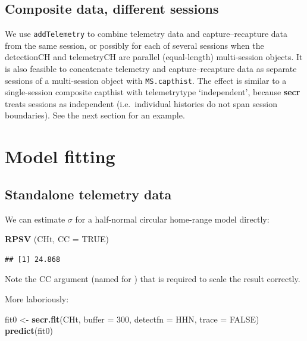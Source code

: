 \documentclass[
]{book}
\newenvironment{Shaded}{\begin{snugshade}}{\end{snugshade}}
\newcommand{\AttributeTok}[1]{\textcolor[rgb]{0.13,0.29,0.53}{#1}}
\newcommand{\ConstantTok}[1]{\textcolor[rgb]{0.56,0.35,0.01}{#1}}
\newcommand{\DecValTok}[1]{\textcolor[rgb]{0.00,0.00,0.81}{#1}}
\newcommand{\FunctionTok}[1]{\textcolor[rgb]{0.13,0.29,0.53}{\textbf{#1}}}
\newcommand{\NormalTok}[1]{#1}
\newcommand{\OtherTok}[1]{\textcolor[rgb]{0.56,0.35,0.01}{#1}}
\newcommand{\StringTok}[1]{\textcolor[rgb]{0.31,0.60,0.02}{#1}}
\begin{document}
\subsection{Composite data, different sessions}\label{composite-data-different-sessions}

We use \texttt{addTelemetry} to combine telemetry data and capture--recapture data from the same session, or possibly for each of several sessions when the detectionCH and telemetryCH are parallel (equal-length) multi-session objects. It is also feasible to concatenate telemetry and capture--recapture data as separate sessions of a multi-session object with \texttt{MS.capthist}. The effect is similar to a single-session composite capthist with telemetrytype `independent', because \textbf{secr} treats sessions as independent (i.e.~individual histories do not span session boundaries). See the next section for an example.

\section{Model fitting}\label{model-fitting-2}

\subsection{Standalone telemetry data}\label{standalone-telemetry-data-1}

We can estimate \(\sigma\) for a half-normal circular home-range model directly:

\begin{Shaded}
\begin{Highlighting}[]
\FunctionTok{RPSV}\NormalTok{ (CHt, }\AttributeTok{CC =} \ConstantTok{TRUE}\NormalTok{)}
\end{Highlighting}
\end{Shaded}

\begin{verbatim}
## [1] 24.868
\end{verbatim}

Note the CC argument (named for \citet{cc58}) that is required to scale the result correctly.

More laboriously:

\begin{Shaded}
\begin{Highlighting}[]
\NormalTok{fit0 }\OtherTok{\textless{}{-}} \FunctionTok{secr.fit}\NormalTok{(CHt, }\AttributeTok{buffer =} \DecValTok{300}\NormalTok{, }\AttributeTok{detectfn =} \StringTok{\textquotesingle{}HHN\textquotesingle{}}\NormalTok{, }
                 \AttributeTok{trace =} \ConstantTok{FALSE}\NormalTok{)}
\FunctionTok{predict}\NormalTok{(fit0)}
\end{Highlighting}
\end{Shaded}
\end{document}
